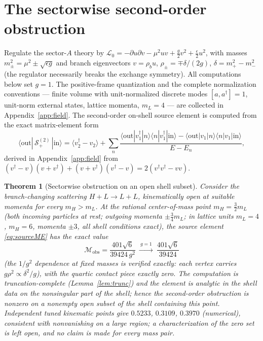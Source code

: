 \documentclass[11pt]{article}
\newtheorem{theorem}{Theorem}[section]
\theoremstyle{definition}
\theoremstyle{remark}
\newcommand{\dg}{\dagger}
\begin{document}
\section{The sectorwise second-order obstruction}\label{sec:sector}

Regulate the sector-$A$ theory by
$\mathcal L_0=-\partial u\partial v-\mu^2uv+\tfrac g2v^2
+\tfrac\epsilon2u^2$, with masses $m_\pm^2=\mu^2\pm\sqrt{\epsilon g}$
and branch eigenvectors $v=\rho_bu$,
$\rho_\pm=\mp\delta/(2g)$, $\delta=m_+^2-m_-^2$ (the regulator
necessarily breaks the exchange symmetry).  All computations below set
$g=1$.  The positive-frame quantization and the complete normalization
conventions --- finite volume with unit-normalized discrete modes
$[a,a^{\dg}]=1$, unit-norm external states, lattice momenta, $m_L=4$
--- are collected in Appendix~\ref{app:field}.  The second-order
on-shell source element is computed from the exact matrix-element form
\begin{equation}\label{eq:sourceME}
\langle\mathrm{out}|\,\mathcal S^{(2)}_+\,|\mathrm{in}\rangle
=\langle v_2^{\dg}-v_2\rangle
+\sum_n\frac{\langle\mathrm{out}|v_1^{\dg}|n\rangle
\langle n|v_1^{\dg}|\mathrm{in}\rangle
-\langle\mathrm{out}|v_1|n\rangle\langle n|v_1|\mathrm{in}\rangle}
{E-E_n},
\end{equation}
derived in Appendix~\ref{app:field} from
$(v^{\dg}-v)(v+v^{\dg})+(v+v^{\dg})(v^{\dg}-v)=2(v^{\dg}v^{\dg}-vv)$.

\begin{theorem}[Sectorwise obstruction on an open shell subset]
\label{thm:sector}
Consider the branch-changing scattering $H+L\to L+L$, kinematically
open at suitable momenta for every $m_H>m_L$.  At the rational
center-of-mass point $m_H=\tfrac32m_L$ (both incoming particles at
rest; outgoing momenta $\pm\tfrac34m_L$; in lattice units $m_L=4$,
$m_H=6$, momenta $\pm3$, all shell conditions exact), the source
element \eqref{eq:sourceME} has the exact value
\begin{equation}
\boxed{\ \mathcal M_{\mathrm{obs}}
=\frac{401\sqrt6}{39424\,g^2}
\ \xrightarrow{\ g=1\ }\ \frac{401\sqrt6}{39424}\ }
\end{equation}
(the $1/g^2$ dependence at fixed masses is verified exactly: each
vertex carries $g\rho^2\propto\delta^2/g$), with the quartic contact
piece exactly zero.  The computation is
truncation-complete (Lemma~\ref{lem:trunc}) and the element is analytic
in the shell data on the nonsingular part of the shell; hence
\emph{the second-order obstruction is nonzero on a nonempty open subset
of the shell containing this point}.  Independent tuned kinematic
points give $0.5233$, $0.3109$, $0.3970$ (numerical), consistent with
nonvanishing on a large region; a characterization of the zero set is
left open, and no claim is made for every mass pair.
\end{theorem}
\end{document}
